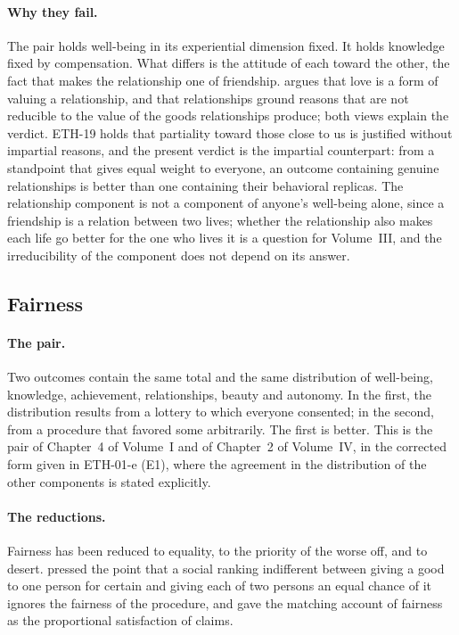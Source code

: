 \documentclass{situationist-preprint}
\begin{document}
\paragraph{Why they fail.} The pair holds well-being in its experiential dimension fixed. It holds knowledge fixed by compensation. What differs is the attitude of each toward the other, the fact that makes the relationship one of friendship. \citet{Kolodny2003} argues that love is a form of valuing a relationship, and \citet{Scheffler1997} that relationships ground reasons that are not reducible to the value of the goods relationships produce; both views explain the verdict. ETH-19 holds that partiality toward those close to us is justified without impartial reasons, and the present verdict is the impartial counterpart: from a standpoint that gives equal weight to everyone, an outcome containing genuine relationships is better than one containing their behavioral replicas. The relationship component is not a component of anyone's well-being alone, since a friendship is a relation between two lives; whether the relationship also makes each life go better for the one who lives it is a question for Volume~III, and the irreducibility of the component does not depend on its answer.

\subsection{Fairness}

\paragraph{The pair.} Two outcomes contain the same total and the same distribution of well-being, knowledge, achievement, relationships, beauty and autonomy. In the first, the distribution results from a lottery to which everyone consented; in the second, from a procedure that favored some arbitrarily. The first is better. This is the pair of Chapter~4 of Volume~I and of Chapter~2 of Volume~IV, in the corrected form given in ETH-01-e (E1), where the agreement in the distribution of the other components is stated explicitly.

\paragraph{The reductions.} Fairness has been reduced to equality, to the priority of the worse off, and to desert. \citet{Diamond1967} pressed the point that a social ranking indifferent between giving a good to one person for certain and giving each of two persons an equal chance of it ignores the fairness of the procedure, and \citet{Broome1990} gave the matching account of fairness as the proportional satisfaction of claims.
\end{document}
